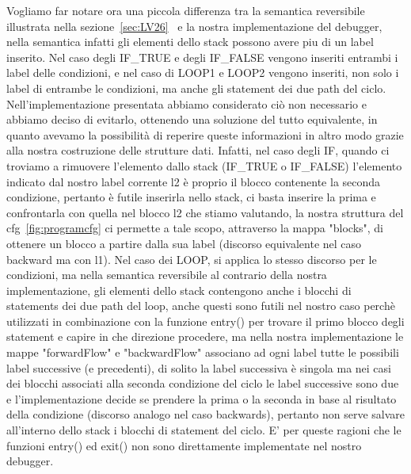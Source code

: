 \documentclass{article}
\theoremstyle{plain}
\theoremstyle{definition}
\theoremstyle{plain}
\begin{document}
Vogliamo far notare ora una piccola differenza tra la semantica reversibile illustrata nella sezione~\ref{sec:LV26}~\cite{LV26} e la nostra implementazione del debugger, nella semantica infatti gli elementi dello stack possono avere piu di un label inserito. Nel caso degli IF\_TRUE e degli IF\_FALSE vengono inseriti entrambi i label delle condizioni, e nel caso di LOOP1 e LOOP2 vengono inseriti, non solo i label di entrambe le condizioni, ma anche gli statement dei due path del ciclo. Nell'implementazione presentata abbiamo considerato ciò non necessario e abbiamo deciso di evitarlo, ottenendo una soluzione del tutto equivalente, in quanto avevamo la possibilità di reperire queste informazioni in altro modo grazie alla nostra costruzione delle strutture dati. Infatti, nel caso degli IF, quando ci troviamo a rimuovere l'elemento dallo stack (IF\_TRUE o IF\_FALSE) l'elemento indicato dal nostro label corrente l2 è proprio il blocco contenente la seconda condizione, pertanto è futile inserirla nello stack, ci basta inserire la prima e confrontarla con quella nel blocco l2 che stiamo valutando, la nostra struttura del cfg~\ref{fig:programcfg} ci permette a tale scopo, attraverso la mappa "blocks", di ottenere un blocco a partire dalla sua label (discorso equivalente nel caso backward ma con l1). Nel caso dei LOOP, si applica lo stesso discorso per le condizioni, ma nella semantica reversibile al contrario della nostra implementazione, gli elementi dello stack contengono anche i blocchi di statements dei due path del loop, anche questi sono futili nel nostro caso perchè utilizzati in combinazione con la funzione entry() per trovare il primo blocco degli statement e capire in che direzione procedere, ma nella nostra implementazione le mappe "forwardFlow" e "backwardFlow" associano ad ogni label tutte le possibili label successive (e precedenti), di solito la label successiva è singola ma nei casi dei blocchi associati alla seconda condizione del ciclo le label successive sono due e l'implementazione decide se prendere la prima o la seconda in base al risultato della condizione (discorso analogo nel caso backwards), pertanto non serve salvare all'interno dello stack i blocchi di statement del ciclo. E' per queste ragioni che le funzioni entry() ed exit() non sono direttamente implementate nel nostro debugger.
\bigskip
\end{document}
